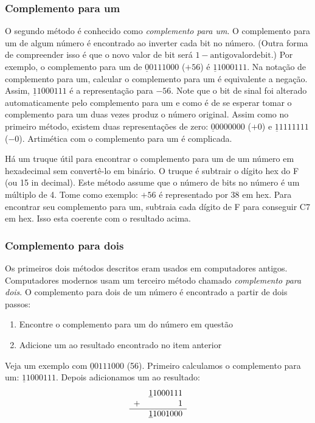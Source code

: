 \subsubsection{Complemento para um }
O segundo método é conhecido como \emph{complemento para um}. O
complemento para um de algum número é encontrado ao inverter cada bit no número.
(Outra forma de compreender isso é que o novo valor de bit será $1 - \mathrm{antigo valor de bit}$.) 
Por exemplo, o complemento para um de 
$\underline{0}0111000$ ($+56$) é $\underline{1}1000111$. Na notação de complemento
para um, calcular o complemento para um é equivalente a negação. Assim,
$\underline{1}1000111$ é a representação para $-56$. Note que o bit de 
sinal foi alterado automaticamente pelo complemento para um e como é de se esperar 
tomar o complemento para um duas vezes produz o número original. Assim como no
primeiro método, existem duas representações de zero: 
$\underline{0}0000000$ ($+0$) e $\underline{1}1111111$ ($-0$). Artimética 
com o complemento para um é complicada.

Há um truque útil para encontrar o complemento para um de um número em
hexadecimal sem convertê-lo em binário. O truque é subtrair o dígito
hex do F (ou 15 in decimal). Este método assume que o número de
bits no número é um múltiplo de 4. Tome como exemplo: $+56$ é
representado por 38 em hex. Para encontrar seu complemento para um, subtraia cada
dígito de F para conseguir C7 em hex. Isso esta coerente com o resultado acima.

\subsubsection{Complemento para dois 
               }

Os primeiros dois métodos descritos eram usados em computadores antigos. Computadores modernos
usam um terceiro método chamado \emph{complemento para dois}. O complemento
para dois de um número é encontrado a partir de dois passos:
\begin{enumerate}
\item Encontre o complemento para um do número em questão
\item Adicione um ao resultado encontrado no item anterior
\end{enumerate}
Veja um exemplo com $\underline{0}0111000$ (56). Primeiro calculamos o
complemento para um: $\underline{1}1000111$. Depois adicionamos um ao resultado:
\[
\begin{array}{rr}
 & \underline{1}1000111 \\
+&                    1 \\ \hline
 & \underline{1}1001000
\end{array}
\]

